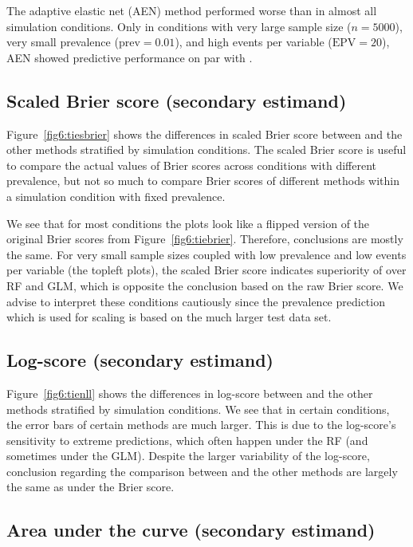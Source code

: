 \begin{subappendices}
The adaptive elastic net (AEN) method performed worse than \ainet{} in almost
all simulation conditions. Only in conditions with very large sample size
($n = 5000$), very small prevalence ($\mbox{prev} = 0.01$), and high events per
variable ($\mbox{EPV} = 20$), AEN showed predictive performance on par with
\ainet{}.

\subsection{Scaled Brier score (secondary estimand)}

Figure~\ref{fig6:tiesbrier} shows the differences in scaled Brier score between
\ainet{} and the other methods stratified by simulation conditions. The scaled
Brier score is useful to compare the actual values of Brier scores across
conditions with different prevalence, but not so much to compare Brier scores of
different methods within a simulation condition with fixed prevalence.

We see that for most conditions the plots look like a flipped version of the
original Brier scores from Figure~\ref{fig6:tiebrier}. Therefore, conclusions are
mostly the same. For very small sample sizes coupled with low prevalence and low
events per variable (the topleft plots), the scaled Brier score indicates
superiority of \ainet{} over RF and GLM, which is opposite the conclusion based
on the raw Brier score. We advise to interpret these conditions cautiously since
the prevalence prediction which is used for scaling is based on the much larger
test data set.


\subsection{Log-score (secondary estimand)}

Figure~\ref{fig6:tienll} shows the differences in log-score between \ainet{} and
the other methods stratified by simulation conditions. We see that in certain
conditions, the error bars of certain methods are much larger. This is due to
the log-score's sensitivity to extreme predictions, which often happen under the
RF (and sometimes under the GLM). Despite the larger variability of the
log-score, conclusion regarding the comparison between \ainet{} and the other
methods are largely the same as under the Brier score.


\subsection{Area under the curve (secondary estimand)}


\end{subappendices}
